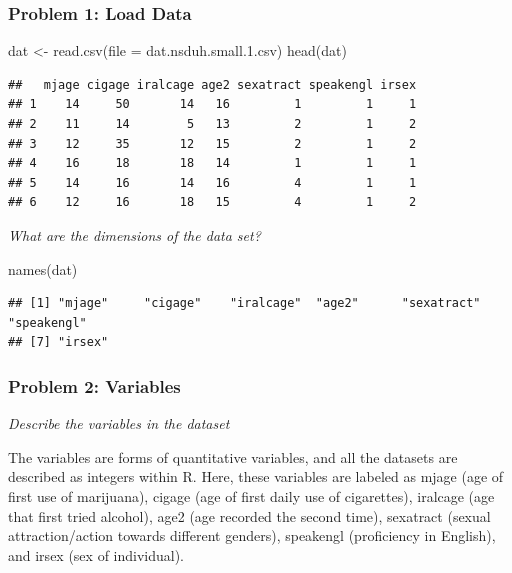 \documentclass[
]{article}
\newenvironment{Shaded}{\begin{snugshade}}{\end{snugshade}}
\newcommand{\AttributeTok}[1]{\textcolor[rgb]{0.77,0.63,0.00}{#1}}
\newcommand{\FunctionTok}[1]{\textcolor[rgb]{0.00,0.00,0.00}{#1}}
\newcommand{\NormalTok}[1]{#1}
\newcommand{\OtherTok}[1]{\textcolor[rgb]{0.56,0.35,0.01}{#1}}
\newcommand{\StringTok}[1]{\textcolor[rgb]{0.31,0.60,0.02}{#1}}
\begin{document}
\hypertarget{problem-1-load-data}{%
\subsubsection{Problem 1: Load Data}\label{problem-1-load-data}}

\begin{Shaded}
\begin{Highlighting}[]
\NormalTok{dat }\OtherTok{\textless{}{-}} \FunctionTok{read.csv}\NormalTok{(}\AttributeTok{file =} \StringTok{\textquotesingle{}dat.nsduh.small.1.csv\textquotesingle{}}\NormalTok{)}
\FunctionTok{head}\NormalTok{(dat)}
\end{Highlighting}
\end{Shaded}

\begin{verbatim}
##   mjage cigage iralcage age2 sexatract speakengl irsex
## 1    14     50       14   16         1         1     1
## 2    11     14        5   13         2         1     2
## 3    12     35       12   15         2         1     2
## 4    16     18       18   14         1         1     1
## 5    14     16       14   16         4         1     1
## 6    12     16       18   15         4         1     2
\end{verbatim}

\emph{What are the dimensions of the data set?}

\begin{Shaded}
\begin{Highlighting}[]
\FunctionTok{names}\NormalTok{(dat)}
\end{Highlighting}
\end{Shaded}

\begin{verbatim}
## [1] "mjage"     "cigage"    "iralcage"  "age2"      "sexatract" "speakengl"
## [7] "irsex"
\end{verbatim}

\hypertarget{problem-2-variables}{%
\subsubsection{Problem 2: Variables}\label{problem-2-variables}}

\emph{Describe the variables in the dataset}

The variables are forms of quantitative variables, and all the datasets
are described as integers within R. Here, these variables are labeled as
mjage (age of first use of marijuana), cigage (age of first daily use of
cigarettes), iralcage (age that first tried alcohol), age2 (age recorded
the second time), sexatract (sexual attraction/action towards different
genders), speakengl (proficiency in English), and irsex (sex of
individual).
\end{document}
